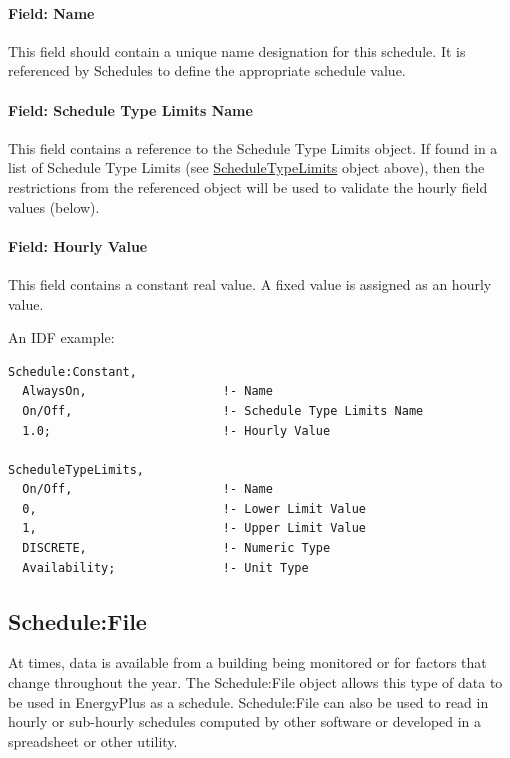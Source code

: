 \paragraph{Field: Name}\label{field-name-7-018}

This field should contain a unique name designation for this schedule. It is referenced by Schedules to define the appropriate schedule value.

\paragraph{Field: Schedule Type Limits Name}\label{field-schedule-type-limits-name-5}

This field contains a reference to the Schedule Type Limits object. If found in a list of Schedule Type Limits (see \hyperref[scheduletypelimits]{ScheduleTypeLimits} object above), then the restrictions from the referenced object will be used to validate the hourly field values (below).

\paragraph{Field: Hourly Value}\label{field-hourly-value}

This field contains a constant real value. A fixed value is assigned as an hourly value.

An IDF example:

\begin{lstlisting}
Schedule:Constant,
  AlwaysOn,                   !- Name
  On/Off,                     !- Schedule Type Limits Name
  1.0;                        !- Hourly Value

ScheduleTypeLimits,
  On/Off,                     !- Name
  0,                          !- Lower Limit Value
  1,                          !- Upper Limit Value
  DISCRETE,                   !- Numeric Type
  Availability;               !- Unit Type
\end{lstlisting}

\subsection{Schedule:File}\label{schedulefile}

At times, data is available from a building being monitored or for factors that change throughout the year. The Schedule:File object allows this type of data to be used in EnergyPlus as a schedule. Schedule:File can also be used to read in hourly or sub-hourly schedules computed by other software or developed in a spreadsheet or other utility.

